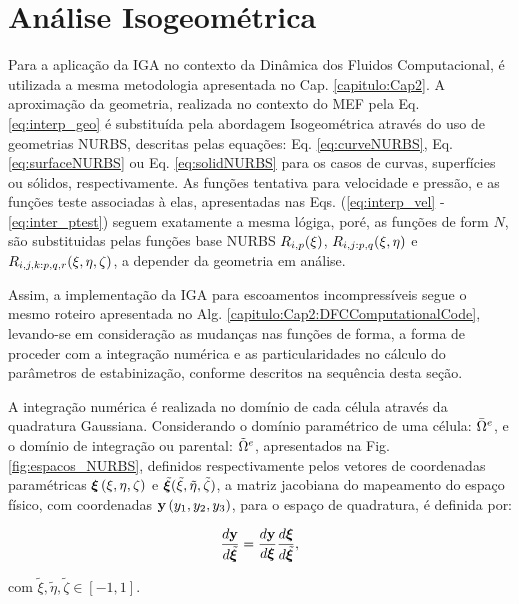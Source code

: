 \documentclass[tese_patricia]{subfiles}
\begin{document}
\section{Análise Isogeométrica}\label{capitulo:Cap3:IGA}

Para a aplicação da IGA no contexto da Dinâmica dos Fluidos Computacional, é utilizada a mesma metodologia apresentada no Cap. \ref{capitulo:Cap2}. A aproximação da geometria, realizada no contexto do MEF pela Eq. \ref{eq:interp_geo} é substituída pela abordagem Isogeométrica através do uso de geometrias NURBS, descritas pelas equações: Eq. \ref{eq:curveNURBS}, Eq. \ref{eq:surfaceNURBS} ou Eq. \ref{eq:solidNURBS} para os casos de curvas, superfícies ou sólidos, respectivamente. As funções tentativa para velocidade e pressão, e as funções teste associadas à elas, apresentadas nas Eqs. (\ref{eq:interp_vel} - \ref{eq:inter_ptest}) seguem exatamente a mesma lógiga, poré, as funções de form $N$, são substituidas pelas funções base NURBS $R_{i,p}(\xi)$, $R_{i,j:p,q}(\xi,\eta)$ e $R_{i,j,k:p,q,r}(\xi,\eta,\zeta)$, a depender da geometria em análise.

Assim, a implementação da IGA para escoamentos incompressíveis segue o mesmo roteiro apresentada no Alg. \ref{capitulo:Cap2:DFCComputationalCode}, levando-se em consideração as mudanças nas funções de forma, a forma de proceder com a integração numérica e as particularidades no cálculo do parâmetros de estabinização, conforme descritos na sequência desta seção.

A integração numérica é realizada no domínio de cada célula através da quadratura Gaussiana. Considerando o domínio paramétrico de uma célula: $\bar{\Omega}^{e}$, e o domínio de integração ou parental: $\tilde{\Omega}^{e}$, apresentados na Fig.\ref{fig:espacos_NURBS}, definidos respectivamente pelos vetores de coordenadas paramétricas $\bm{\xi}\left(\xi,\eta,\zeta\right)$ e $\tilde{\bm{\xi}}(\tilde{\xi},\tilde{\eta},\tilde{\zeta})$, a matriz jacobiana do mapeamento do espaço físico, com coordenadas $\mathbf{y} \left(y_1,y_2,y_3\right)$,  para o espaço de quadratura, é definida por:

\begin{align}
\frac{d\mathbf{y}}{d\tilde{\bm{\xi}}} = \frac{d\mathbf{y}}{d\bm{\xi}} \frac{d\bm{\xi}}{d\tilde{\bm{\xi}}}, \label{eq:integ}
\end{align} 

\noindent com $\tilde{\xi}, \tilde{\eta}, \tilde{\zeta} \in [-1, 1]$.
\end{document}
